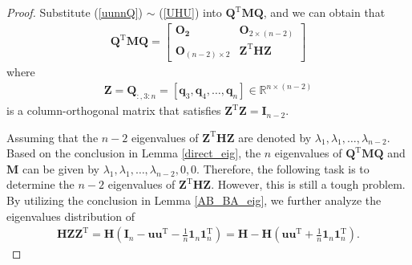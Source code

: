 \begin{proof}


Substitute   (\ref{uunnQ}) $\sim$ (\ref{UHU}) into 
$
\mathbf Q^{\mathrm T}  
\mathbf   M
\mathbf Q
$, and 
we can obtain that 
\begin{align}\label{blockdiag0}
\mathbf Q^{\mathrm T}  
\mathbf   M
\mathbf Q
=
	\left[\begin{array}{cc}
	\mathbf {O_{2}} & \mathbf {O}_{2 \times (n-2)} \\
	\mathbf {O}_{(n-2) \times 2} & 
	\mathbf Z^{\mathrm T}  
	\mathbf H
	\mathbf Z
\end{array}\right]
\end{align}
where 
\begin{align}\label{Hblockfor3}
\mathbf   Z
=
\mathbf   Q_{:,3:n}
=
[\mathbf q_{3},  \mathbf q_{4}, \dots,  \mathbf q_{n}] 
\in  
\mathbb R^{n \times (n-2)}
\end{align}
is a column-orthogonal matrix 
that satisfies 
$\mathbf Z^{\mathrm T}   \mathbf   Z 
=
\mathbf I_{n-2}$.  

Assuming  that 
the $n-2$ eigenvalues of 
$ 	\mathbf Z^{\mathrm T}  
\mathbf H
\mathbf Z $
are  denoted  by 
$
\lambda_{1}, \lambda_{1},  \dots, \lambda_{n-2}$.
Based on  the conclusion  in 
Lemma  \ref{direct_eig},  the $n$  eigenvalues  of  
$\mathbf Q^{\mathrm T}  
\mathbf   M
\mathbf Q$ 
and   
$
\mathbf   M
$ 
can  be  given  by 
$
\lambda_{1}, \lambda_{1},  \dots, \lambda_{n-2}, 0, 0$.
Therefore,  the  following  task  is to  determine  the 
$n-2$ eigenvalues of 
$ 	\mathbf Z^{\mathrm T}  
\mathbf H
\mathbf Z $.
However,  
this is  still a   tough  problem.
By  utilizing  the  conclusion  in  Lemma 
\ref{AB_BA_eig}, 
we   further  analyze  the  eigenvalues   distribution  of 
\begin{align}\label{hzzt}
\mathbf H
\mathbf Z
	\mathbf Z^{\mathrm T} 
	=
\mathbf H
 (\mathbf  I_{n}  - 
\mathbf u\mathbf u^{\mathrm T}  
- \frac  1n \mathbf 1_{n}\mathbf 1_{n}^{\mathrm T} )
=
\mathbf H
  - 
\mathbf H
(\mathbf u\mathbf u^{\mathrm T}  
+\frac  1n \mathbf 1_{n}\mathbf 1_{n}^{\mathrm T} ).
\end{align}


\end{proof}
